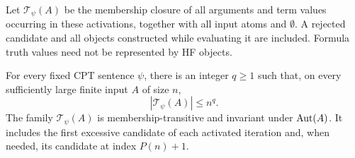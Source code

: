 Let \(\mathcal T_\psi(A)\) be the membership closure of all arguments and
term values occurring in these activations, together with all input atoms
and \(\emptyset\).  A rejected candidate and all objects constructed while
evaluating it are included.  Formula truth values need not be represented
by HF objects.

\begin{lemma}
\label{eval:trace}
For every fixed CPT sentence \(\psi\), there is an integer \(q\ge1\)
such that, on every sufficiently large finite input \(A\) of size \(n\),
\[
 |\mathcal T_\psi(A)|\le n^q.
\]
The family \(\mathcal T_\psi(A)\) is membership-transitive and invariant
under \(\operatorname{Aut}(A)\).  It includes the first excessive candidate of each
activated iteration and, when needed, its candidate at index \(P(n)+1\).
\end{lemma}

